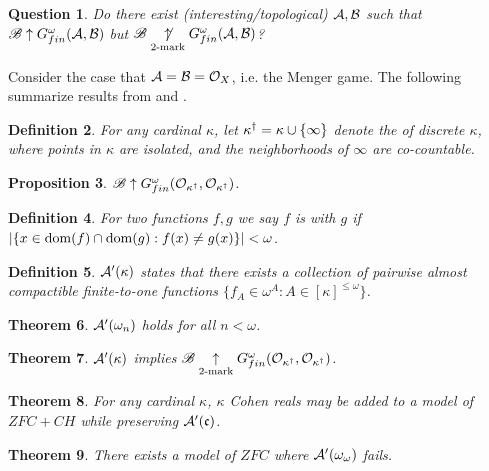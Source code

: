 \documentclass{amsart}
\newtheorem{theorem}{Theorem}[section]
\newtheorem{de}[theorem]{Definition}
\newtheorem{pr}[theorem]{Proposition}
\newtheorem{qu}[theorem]{Question}
\begin{document}
\begin{qu}
  Do there exist (interesting/topological) \(\mathcal{A},\mathcal{B}\) such that
  \(\mathscr{B}\uparrow G^\omega_{fin}(\mathcal{A},\mathcal{B})\) but
  \(\mathscr{B}\underset{2\text{-mark}}{\not\uparrow}G^\omega_{fin}(\mathcal{A},\mathcal{B})\)?
\end{qu}

Consider the case that \(\mathcal{A}=\mathcal{B}=\mathcal{O}_X\),
i.e. the Menger game. The following summarize results from
\cite{SchCountFin}
\cite{ClontzMenger} and \cite{ClontzDow}.

\begin{de}
  For any cardinal \(\kappa\), let \(\kappa^\dagger=\kappa\cup\{\infty\}\)
  denote the  of discrete \(\kappa\),
  where points in \(\kappa\) are isolated, and the neighborhoods of
  \(\infty\) are co-countable.
\end{de}

\begin{pr}
  \(\mathscr{B}\uparrow G^\omega_{fin}(\mathcal{O}_{\kappa^\dagger},\mathcal{O}_{\kappa^\dagger})\).
\end{pr}

\begin{de}
  For two functions \(f,g\) we say \(f\) is  with
  \(g\) if \(|\{x\in\operatorname{dom}(f)\cap\operatorname{dom}(g):f(x)\not=g(x)\}|<\omega\).
\end{de}

\begin{de}
  \(\mathcal{A}'(\kappa)\) states that there exists a collection of pairwise
  almost compactible finite-to-one functions
  \(\{f_A\in\omega^A:A\in[\kappa]^{\leq\omega}\}\).
\end{de}

\begin{theorem}
  \(\mathcal{A}'(\omega_n)\) holds for all \(n<\omega\).
\end{theorem}

\begin{theorem}
  \(\mathcal{A}'(\kappa)\) implies
  \(\mathscr{B}\underset{2\text{-mark}}{\uparrow}G^\omega_{fin}(\mathcal{O}_{\kappa^\dagger},\mathcal{O}_{\kappa^\dagger})\).
\end{theorem}

\begin{theorem}
  For any cardinal \(\kappa\),
  \(\kappa\) Cohen reals may be added to a model of \(ZFC+CH\)
  while preserving \(\mathcal{A}'(\mathfrak{c})\).
\end{theorem}

\begin{theorem}
  There exists a model of \(ZFC\) where \(\mathcal{A}'(\omega_\omega)\) fails.
\end{theorem}
\end{document}
